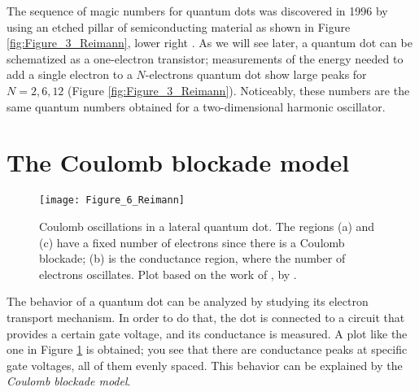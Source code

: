 The sequence of magic numbers for quantum dots was discovered in 1996 by using an etched pillar of semiconducting material as shown in Figure \ref{fig:Figure_3_Reimann}, lower right \citep[see also][]{Tarucha1996}. As we will see later, a quantum dot can be schematized as a one-electron transistor; measurements of the energy needed to add a single electron to a $N$-electrons quantum dot show large peaks for $N=2,6,12$ (Figure \ref{fig:Figure_3_Reimann}). Noticeably, these numbers are the same quantum numbers obtained for a two-dimensional harmonic oscillator.

\section{The Coulomb blockade model}

\begin{figure}[h]%
	\centering
    \texttt{[image: Figure\_6\_Reimann]}
    \caption{Coulomb oscillations in a lateral quantum dot. The regions (a) and (c) have a fixed number of electrons since there is a Coulomb blockade; (b) is the conductance region, where the number of electrons oscillates. Plot based on the work of \cite{Meirav1990}, by \cite{Meir1991}.}
	\label{fig:Figure_6_Reimann}
\end{figure}

The behavior of a quantum dot can be analyzed by studying its electron transport mechanism. In order to do that, the dot is connected to a circuit that provides a certain gate voltage, and its conductance is measured. A plot like the one in Figure \ref{fig:Figure_6_Reimann} is obtained; you see that there are conductance peaks at specific gate voltages, all of them evenly spaced. This behavior can be explained by the \emph{Coulomb blockade model}.

\newcommand{\trcomponent}[2]
{
	\draw (#1) node[align=center] {\textnormal #2};
}

\newcommand{\circlecomp}[2]
{
	\draw[thick] (#1) node[draw,shape=circle,scale=0.85,align=center] {#2};
}

\newcommand{\vertcomp}[2]
{
\draw[thick] (#1) node[draw,shape=rectangle,scale=1,align=center] {\textnormal #2};
}

